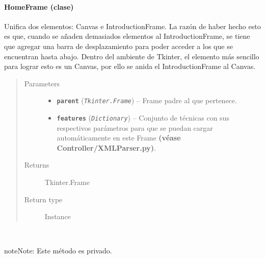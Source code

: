 \documentclass[class=report, crop=false]{standalone}
\begin{document}
\paragraph{HomeFrame (clase)}
\label{sec:a_3_2_1_1}

\begin{fulllineitems}

\begin{DUlineblock}{0em}
\item[] Unifica dos elementos: Canvas e IntroductionFrame.\break
La razón de haber hecho esto es que, cuando se añaden demasiados 
elementos al IntroductionFrame, se tiene que agregar una barra de 
desplazamiento para poder acceder a los que se encuentran hasta abajo.\break
Dentro del ambiente de Tkinter, el elemento más sencillo para lograr 
esto es un Canvas, por ello se anida el IntroductionFrame al Canvas.
\end{DUlineblock}

\begin{quote}\begin{description}
\item[{Parameters}] \leavevmode\begin{itemize}
\item \textbf{\texttt{parent}} (\emph{\texttt{Tkinter.Frame}}) -- Frame padre al que pertenece.
\item \textbf{\texttt{features}} (\emph{\texttt{Dictionary}}) -- Conjunto de técnicas con sus respectivos parámetros para que se puedan cargar automáticamente en este Frame \textbf{(véase
Controller/XMLParser.py)}.
\end{itemize}

\item[{Returns}] \leavevmode
Tkinter.Frame
\item[{Return type}] \leavevmode
Instance
\end{description}\end{quote}


\begin{fulllineitems}

~

\begin{notice}{note}{Note:}
Este método es privado.
\end{notice}


\end{fulllineitems}
\end{fulllineitems}
\end{document}
